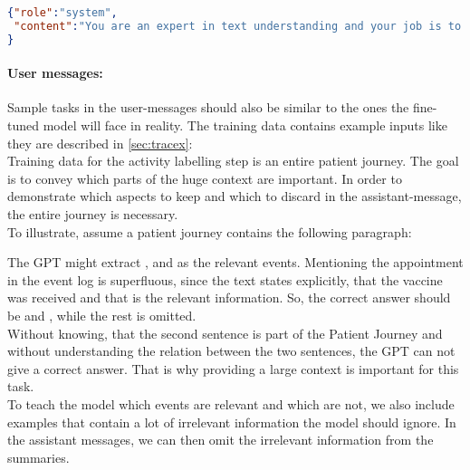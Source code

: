 \begin{lstlisting}[language=json, caption={System message for determining an activies start timestamp}, label={lst:system:starttime}]
{"role":"system",
 "content":"You are an expert in text understanding and your job is to take a given text and a given activity label and to extract a start date to this activity label. Only output the extracted start date! Rely on the context to determine the start date, as it might not be explicitly mentioned."
}
\end{lstlisting}

\paragraph{User messages:}\label{par:user-messages} Sample tasks in the user-messages should also be similar to the ones the fine-tuned model will face in reality. The training data contains example inputs like they are described in \autoref{sec:tracex}:\\
Training data for the activity labelling step is an entire patient journey. The goal is to convey which parts of the huge context are important. In order to demonstrate which aspects to keep and which to discard in the assistant-message, the entire journey is necessary.\\
To illustrate, assume a patient journey contains the following paragraph:
\begin{quote}
\end{quote}
The GPT might extract  ,  and  as the relevant events. Mentioning the appointment in the event log is superfluous, since the text states explicitly, that the vaccine was received and that is the relevant information. So, the correct answer should be  and , while the rest is omitted.\\
Without knowing, that the second sentence is part of the Patient Journey and without understanding the relation between the two sentences, the GPT can not give a correct answer. That is why providing a large context is important for this task.\\
To teach the model which events are relevant and which are not, we also include examples that contain a lot of irrelevant information the model should ignore. In the assistant messages, we can then omit the irrelevant information from the summaries.\\
